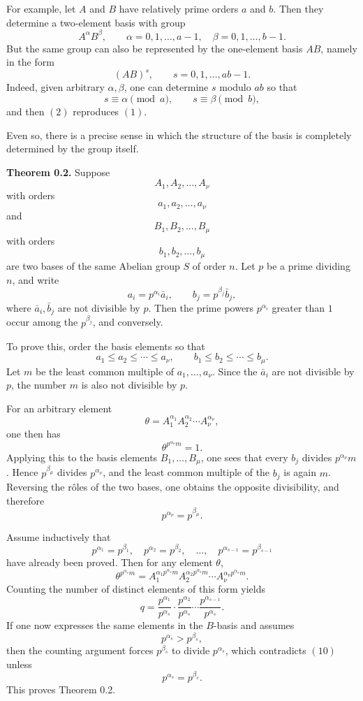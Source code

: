 \documentclass[11pt]{article}
\begin{document}
For example, let \(A\) and \(B\) have relatively prime orders \(a\) and \(b\). Then they determine a two-element basis with group
\[
A^\alpha B^\beta,
\qquad
\alpha=0,1,\dots,a-1,\quad \beta=0,1,\dots,b-1.
\tag{1}
\]
But the same group can also be represented by the one-element basis \(AB\), namely in the form
\[
(AB)^s,
\qquad
s=0,1,\dots,ab-1.
\tag{2}
\]
Indeed, given arbitrary \(\alpha,\beta\), one can determine \(s\) modulo \(ab\) so that
\[
s\equiv \alpha \pmod a,\qquad s\equiv \beta \pmod b,
\]
and then \((2)\) reproduces \((1)\).

Even so, there is a precise sense in which the structure of the basis is completely determined by the group itself.

\medskip
\noindent\textbf{Theorem 0.2.}
Suppose
\[
A_1,A_2,\dots,A_\nu
\]
with orders
\[
a_1,a_2,\dots,a_\nu
\]
and
\[
B_1,B_2,\dots,B_\mu
\]
with orders
\[
b_1,b_2,\dots,b_\mu
\]
are two bases of the same Abelian group \(S\) of order \(n\). Let \(p\) be a prime dividing \(n\), and write
\[
a_i=p^{\alpha_i}\bar a_i,\qquad b_j=p^{\beta_j}\bar b_j,
\]
where \(\bar a_i,\bar b_j\) are not divisible by \(p\). Then the prime powers \(p^{\alpha_i}\) greater than \(1\) occur among the \(p^{\beta_j}\), and conversely.

\medskip
To prove this, order the basis elements so that
\[
a_1\leq a_2\leq \cdots\leq a_\nu,\qquad
b_1\leq b_2\leq \cdots\leq b_\mu.
\tag{3}
\]
Let \(m\) be the least common multiple of \(a_1,\dots,a_\nu\). Since the \(\bar a_i\) are not divisible by \(p\), the number \(m\) is also not divisible by \(p\).

For an arbitrary element
\[
\theta=A_1^{\alpha_1}A_2^{\alpha_2}\cdots A_\nu^{\alpha_\nu},
\tag{4}
\]
one then has
\[
\theta^{p^{\alpha_\nu}m}=1.
\]
Applying this to the basis elements \(B_1,\dots,B_\mu\), one sees that every \(b_j\) divides \(p^{\alpha_\nu}m\). Hence \(p^{\beta_\mu}\) divides \(p^{\alpha_\nu}\), and the least common multiple of the \(b_j\) is again \(m\). Reversing the rôles of the two bases, one obtains the opposite divisibility, and therefore
\[
p^{\alpha_\nu}=p^{\beta_\mu}.
\tag{5}
\]

Assume inductively that
\[
p^{\alpha_1}=p^{\beta_1},\quad
p^{\alpha_2}=p^{\beta_2},\quad
\dots,\quad
p^{\alpha_{s-1}}=p^{\beta_{s-1}}
\tag{6}
\]
have already been proved. Then for any element \(\theta\),
\[
\theta^{p^{\alpha_s}m}
=
A_1^{\alpha_1p^{\alpha_s}m}
A_2^{\alpha_2p^{\alpha_s}m}
\cdots
A_\nu^{\alpha_\nu p^{\alpha_s}m}.
\tag{7}
\]
Counting the number of distinct elements of this form yields
\[
q=
\frac{p^{\alpha_1}}{p^{\alpha_s}}
\cdot
\frac{p^{\alpha_2}}{p^{\alpha_s}}
\cdots
\frac{p^{\alpha_{s-1}}}{p^{\alpha_s}}.
\tag{9}
\]
If one now expresses the same elements in the \(B\)-basis and assumes
\[
p^{\alpha_s}>p^{\beta_s},
\tag{10}
\]
then the counting argument forces \(p^{\beta_s}\) to divide \(p^{\alpha_s}\), which contradicts \((10)\) unless
\[
p^{\alpha_s}=p^{\beta_s}.
\tag{14}
\]
This proves Theorem 0.2.
\end{document}
